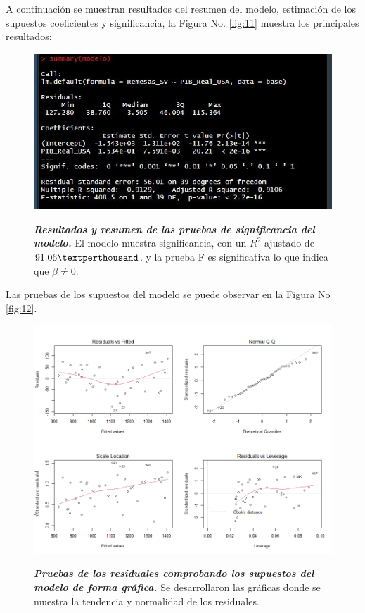 A continuación se muestran resultados del resumen del modelo, estimación de los supuestos coeficientes y significancia, la Figura No. \eqref{fig:11} muestra los principales resultados: 

\begin{figure}[H]
	\centering
	\resizebox{10 cm}{!} { 
		\includegraphics[width=1\linewidth]{Imagenes/Modelo}}
	\caption{\textbf{\textit{Resultados y resumen de las pruebas de significancia del modelo.}}
		{\small El modelo muestra significancia, con un $R^{2}$ ajustado de $91.06\textperthousand$.  y la prueba F es significativa lo que indica que $\beta \neq 0$.}
	} 
	\label{fig:11}
	
\end{figure}

Las pruebas de los supuestos del modelo se puede observar en la Figura No \eqref{fig:12}. 

\begin{figure}[H]
	\centering
	\resizebox{17 cm}{!} { 
		\includegraphics[width=1\linewidth]{Imagenes/PruebasModelo}}
	\caption{\textbf{\textit{Pruebas de los residuales comprobando los supuestos del modelo de forma gráfica.}}
		{\small Se desarrollaron las gráficas donde se muestra la tendencia y normalidad de los residuales.}
	} 
	\label{fig:12}
	
\end{figure}

